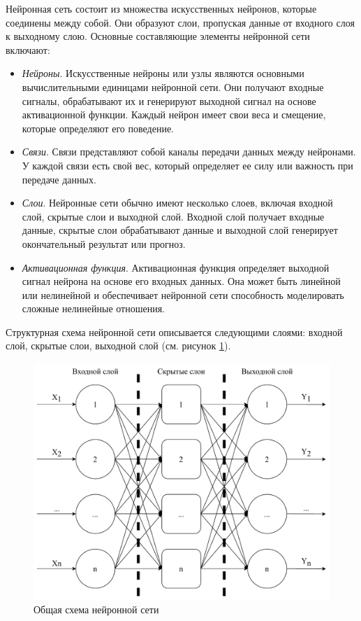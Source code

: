 Нейронная сеть состоит из множества искусственных нейронов, которые соединены между собой. Они образуют слои, пропуская данные от входного слоя к выходному слою. Основные составляющие элементы нейронной сети включают:

\begin{itemize}
    \item \textit{Нейроны}. Искусственные нейроны или узлы являются основными вычислительными единицами нейронной сети. Они получают входные сигналы, обрабатывают их и генерируют выходной сигнал на основе активационной функции. Каждый нейрон имеет свои веса и смещение, которые определяют его поведение.
    \item \textit{Связи}. Связи представляют собой каналы передачи данных между нейронами. У каждой связи есть свой вес, который определяет ее силу или важность при передаче данных.
    \item \textit{Слои}. Нейронные сети обычно имеют несколько слоев, включая входной слой, скрытые слои и выходной слой. Входной слой получает входные данные, скрытые слои обрабатывают данные и выходной слой генерирует окончательный результат или прогноз.
    \item \textit{Активационная функция}. Активационная функция определяет выходной сигнал нейрона на основе его входных данных. Она может быть линейной или нелинейной и обеспечивает нейронной сети способность моделировать сложные нелинейные отношения.
\end{itemize}

Структурная схема нейронной сети описывается следующими слоями: входной слой, скрытые слои, выходной слой (см. рисунок \ref{fig:simple_net}).

\begin{figure}[h!btp]
	\centering
	\includegraphics[scale = 0.7]{inc/analysis/simple_net.pdf}
	\caption{Общая схема нейронной сети}
	\label{fig:simple_net}	
\end{figure}

